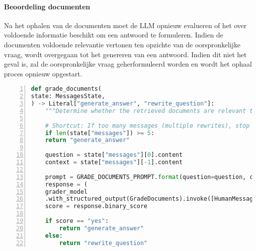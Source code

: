 \paragraph{Beoordeling documenten}

Na het ophalen van de documenten moet de LLM opnieuw evalueren of het over voldoende informatie beschikt om een antwoord te formuleren. Indien de documenten voldoende relevantie vertonen ten opzichte van de oorspronkelijke vraag, wordt overgegaan tot het genereren van een antwoord. Indien dit niet het geval is, zal de oorspronkelijke vraag geherformuleerd worden en wordt het ophaal proces opnieuw opgestart.

\begin{lstlisting}[basicstyle=\small, frame=single, breaklines=true, postbreak=\mbox{\textcolor{red}{$\hookrightarrow$}\space}, escapeinside ={\%,}, escapechar={!}, numbers=left, language=Python, caption=Beoordeling van documenten]
def grade_documents(
state: MessagesState,
) -> Literal["generate_answer", "rewrite_question"]:
    """Determine whether the retrieved documents are relevant to the question."""

    # Shortcut: If too many messages (multiple rewrites), stop rewriting
    if len(state["messages"]) >= 5:
    return "generate_answer"
    
    question = state["messages"][0].content
    context = state["messages"][-1].content
    
    prompt = GRADE_DOCUMENTS_PROMPT.format(question=question, context=context)
    response = (
    grader_model
    .with_structured_output(GradeDocuments).invoke([HumanMessage(content=prompt)]))
    score = response.binary_score
    
    if score == "yes":
        return "generate_answer"
    else:
        return "rewrite_question"
\end{lstlisting}

